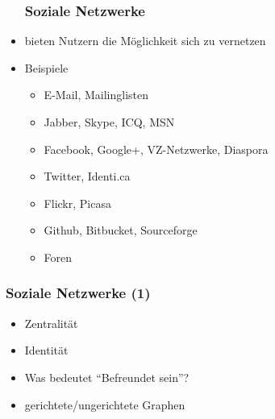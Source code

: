 \documentclass{beamer}
\begin{document}
\begin{frame}
  \begin{itemize}
  \frametitle{Soziale Netzwerke}
    \item<2-> bieten Nutzern die Möglichkeit sich zu vernetzen
    \item<3-> Beispiele
      \begin{itemize}
        \item<4-> E-Mail, Mailinglisten
        \item<5-> Jabber, Skype, ICQ, MSN
        \item<6-> Facebook, Google+, VZ-Netzwerke, Diaspora
        \item<7-> Twitter, Identi.ca
        \item<8-> Flickr, Picasa
        \item<9-> Github, Bitbucket, Sourceforge
        \item<10-> Foren
      \end{itemize}
  \end{itemize}
\end{frame}

\begin{frame}
  \frametitle{Soziale Netzwerke (1)}
  \begin{itemize}
    \item<2-> Zentralität
    \item<3-> Identität
    \item<4-> Was bedeutet "`Befreundet sein"'?
    \item<5-> gerichtete/ungerichtete Graphen
  \end{itemize}
\end{frame}
\end{document}
